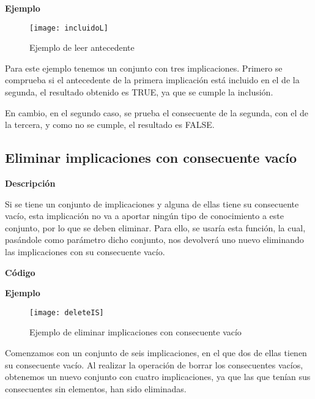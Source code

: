     
    \bigskip

    \textbf{Ejemplo}

    \begin{figure}[H]
        \centering
        \texttt{[image: incluidoL]}
        \caption{Ejemplo de leer antecedente}
        \label{fig:incluidoL}
    \end{figure}

    Para este ejemplo tenemos un conjunto con tres implicaciones. Primero se comprueba si el antecedente de la primera implicaci\'on 
    est\'a incluido en el de la segunda, el resultado obtenido es TRUE, ya que se cumple la inclusi\'on.

    En cambio, en el segundo caso, se prueba el consecuente de la segunda, con el de la tercera, y como no se cumple, el resultado es FALSE.



\subsection{Eliminar implicaciones con consecuente vac\'io}

    \textbf{Descripci\'on}

    Si se tiene un conjunto de implicaciones y alguna de ellas tiene su consecuente vac\'io, esta implicaci\'on no va a 
    aportar ning\'un tipo de conocimiento a este conjunto, por lo que se deben eliminar. Para ello, se usar\'ia esta funci\'on, 
    la cual, pas\'andole como par\'ametro dicho conjunto, nos devolver\'a uno nuevo eliminando las implicaciones con su consecuente 
    vac\'io.
    \\
    \clearpage

    \textbf{C\'odigo}

    
    \bigskip

    \textbf{Ejemplo}

    \begin{figure}[H]
        \centering
        \texttt{[image: deleteIS]}
        \caption{Ejemplo de eliminar implicaciones con consecuente vac\'io}
        \label{fig:deleteIS}
    \end{figure}

    Comenzamos con un conjunto de seis implicaciones, en el que dos de ellas tienen su consecuente vac\'io. Al realizar la 
    operaci\'on de borrar los consecuentes vac\'ios, obtenemos un nuevo conjunto con cuatro implicaciones, ya que las que ten\'ian 
    sus consecuentes sin elementos, han sido eliminadas.



